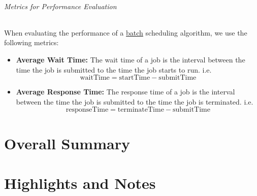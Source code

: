 \documentclass[openany,12pt]{book}
\begin{document}
\paragraph{Metrics for Performance Evaluation}
When evaluating the performance of a \underline{batch} scheduling algorithm, we use the following metrics:
\begin{itemize}
    \item \textbf{Average Wait Time:} The wait time of a job is the interval between the time the job is submitted to the time the job starts to run. i.e.
          \begin{equation*}
              \text{waitTime} = \text{startTime} - \text{submitTime}
          \end{equation*}

    \item \textbf{Average Response Time:} The response time of a job is the interval between the time the job is submitted to the time the job is terminated. i.e.
          \begin{equation*}
              \text{responseTime} = \text{terminateTime} - \text{submitTime}
          \end{equation*}
\end{itemize}














\newpage
\part{Overall Summary}
















\newpage
\part{Highlights and Notes}
\end{document}
